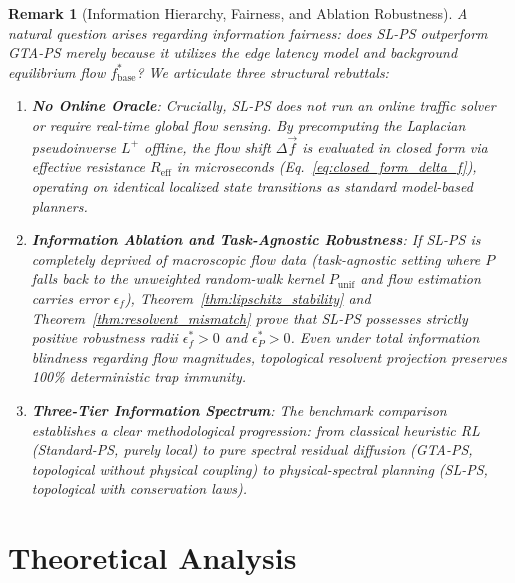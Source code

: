 \documentclass[11pt,a4paper]{article}
\newtheorem{remark}{Remark}
\begin{document}
\begin{remark}[Information Hierarchy, Fairness, and Ablation Robustness]
\label{rem:information_hierarchy}
A natural question arises regarding information fairness: does SL-PS outperform GTA-PS merely because it utilizes the edge latency model and background equilibrium flow $f_{\text{base}}^*$? We articulate three structural rebuttals:
\begin{enumerate}
    \item \textbf{No Online Oracle}: Crucially, SL-PS does \textit{not} run an online traffic solver or require real-time global flow sensing. By precomputing the Laplacian pseudoinverse $L^+$ offline, the flow shift $\Delta \vec{f}$ is evaluated in closed form via effective resistance $R_{\text{eff}}$ in microseconds (Eq.~\eqref{eq:closed_form_delta_f}), operating on identical localized state transitions as standard model-based planners.
    \item \textbf{Information Ablation and Task-Agnostic Robustness}: If SL-PS is completely deprived of macroscopic flow data (task-agnostic setting where $P$ falls back to the unweighted random-walk kernel $P_{\text{unif}}$ and flow estimation carries error $\epsilon_f$), Theorem~\ref{thm:lipschitz_stability} and Theorem~\ref{thm:resolvent_mismatch} prove that SL-PS possesses strictly positive robustness radii $\epsilon_f^* > 0$ and $\epsilon_P^* > 0$. Even under total information blindness regarding flow magnitudes, topological resolvent projection preserves 100\% deterministic trap immunity.
    \item \textbf{Three-Tier Information Spectrum}: The benchmark comparison establishes a clear methodological progression: from classical heuristic RL (Standard-PS, purely local) to pure spectral residual diffusion (GTA-PS, topological without physical coupling) to physical-spectral planning (SL-PS, topological with conservation laws).
\end{enumerate}
\end{remark}

\section{Theoretical Analysis}
\label{sec:theory}
\end{document}
